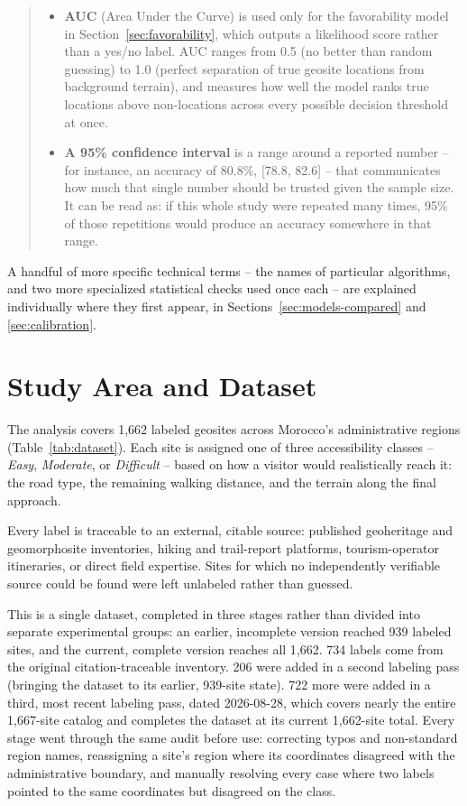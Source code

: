 \documentclass[11pt,a4paper]{article}
\newenvironment{termbox}
  {\begin{quote}\small\begin{itemize}[leftmargin=1.1em]}
  {\end{itemize}\end{quote}}
\begin{document}
\begin{termbox}
\item \textbf{AUC} (Area Under the Curve) is used only for the favorability model in Section~\ref{sec:favorability}, which outputs a likelihood score rather than a yes/no label. AUC ranges from 0.5 (no better than random guessing) to 1.0 (perfect separation of true geosite locations from background terrain), and measures how well the model ranks true locations above non-locations across every possible decision threshold at once.
\item \textbf{A 95\% confidence interval} is a range around a reported number -- for instance, an accuracy of 80.8\%, [78.8, 82.6] -- that communicates how much that single number should be trusted given the sample size. It can be read as: if this whole study were repeated many times, 95\% of those repetitions would produce an accuracy somewhere in that range.
\end{termbox}

A handful of more specific technical terms -- the names of particular algorithms, and two more specialized statistical checks used once each -- are explained individually where they first appear, in Sections~\ref{sec:models-compared} and \ref{sec:calibration}.

\section{Study Area and Dataset}
The analysis covers 1{,}662 labeled geosites across Morocco's administrative regions (Table~\ref{tab:dataset}). Each site is assigned one of three accessibility classes -- \emph{Easy}, \emph{Moderate}, or \emph{Difficult} -- based on how a visitor would realistically reach it: the road type, the remaining walking distance, and the terrain along the final approach.

Every label is traceable to an external, citable source: published geoheritage and geomorphosite inventories, hiking and trail-report platforms, tourism-operator itineraries, or direct field expertise. Sites for which no independently verifiable source could be found were left unlabeled rather than guessed.

This is a single dataset, completed in three stages rather than divided into separate experimental groups: an earlier, incomplete version reached 939 labeled sites, and the current, complete version reaches all 1{,}662. 734 labels come from the original citation-traceable inventory. 206 were added in a second labeling pass (bringing the dataset to its earlier, 939-site state). 722 more were added in a third, most recent labeling pass, dated 2026-08-28, which covers nearly the entire 1{,}667-site catalog and completes the dataset at its current 1{,}662-site total. Every stage went through the same audit before use: correcting typos and non-standard region names, reassigning a site's region where its coordinates disagreed with the administrative boundary, and manually resolving every case where two labels pointed to the same coordinates but disagreed on the class.
\end{document}
